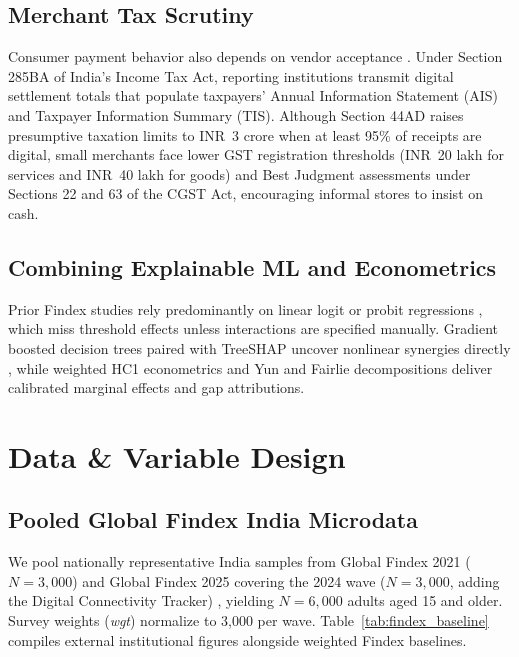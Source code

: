 \documentclass[conference]{IEEEtran}
\begin{document}
\subsection{Merchant Tax Scrutiny}
Consumer payment behavior also depends on vendor acceptance \cite{arango2015}. Under Section 285BA of India's Income Tax Act, reporting institutions transmit digital settlement totals that populate taxpayers' Annual Information Statement (AIS) and Taxpayer Information Summary (TIS). Although Section 44AD raises presumptive taxation limits to INR~3 crore when at least 95\% of receipts are digital, small merchants face lower GST registration thresholds (INR~20 lakh for services and INR~40 lakh for goods) and Best Judgment assessments under Sections 22 and 63 of the CGST Act, encouraging informal stores to insist on cash.

\subsection{Combining Explainable ML and Econometrics}
Prior Findex studies rely predominantly on linear logit or probit regressions \cite{mukhopadhyay2016, sutradhar2024}, which miss threshold effects unless interactions are specified manually. Gradient boosted decision trees \cite{chen2016} paired with TreeSHAP \cite{lundberg2020} uncover nonlinear synergies directly \cite{maehara2024}, while weighted HC1 econometrics and Yun and Fairlie decompositions \cite{fairlie2005, yun2004} deliver calibrated marginal effects and gap attributions.

\section{Data \& Variable Design}

\subsection{Pooled Global Findex India Microdata}
We pool nationally representative India samples from Global Findex 2021 ($N = 3,000$) \cite{demirguc2022} and Global Findex 2025 covering the 2024 wave ($N = 3,000$, adding the Digital Connectivity Tracker) \cite{worldbank2025}, yielding $N = 6,000$ adults aged 15 and older. Survey weights (\textit{wgt}) normalize to 3,000 per wave. Table~\ref{tab:findex_baseline} compiles external institutional figures alongside weighted Findex baselines.
\end{document}
